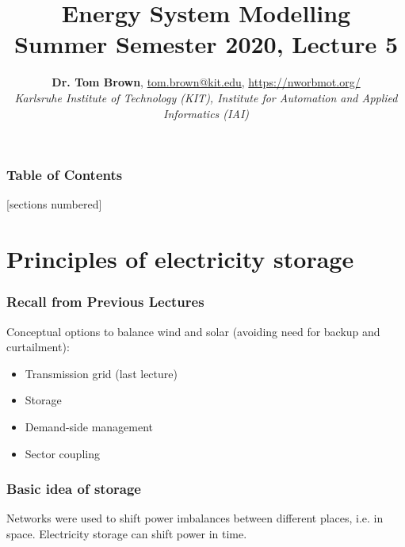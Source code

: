 \documentclass[10pt,aspectratio=169,dvipsnames]{beamer}
\title{Energy System Modelling\\ Summer Semester 2020, Lecture 5}
\author{
  {\bf Dr. Tom Brown}, \href{mailto:tom.brown@kit.edu}{tom.brown@kit.edu}, \url{https://nworbmot.org/}\\
  \emph{Karlsruhe Institute of Technology (KIT), Institute for Automation and Applied Informatics (IAI)}
}
\date{}
\let\olditem\item
\renewcommand{\item}{%
\olditem\vspace{5pt}}
\begin{document}
\maketitle


\begin{frame}

  \frametitle{Table of Contents}
  [sections numbered]
  \tableofcontents[hideallsubsections]
\end{frame}


\section{Principles of electricity storage}



\begin{frame}
 \frametitle{Recall from Previous Lectures}
 Conceptual options to balance wind and solar (avoiding need for backup and curtailment):
 \begin{itemize}
  \item Transmission grid (last lecture)
  \item \alert{Storage}
  \item Demand-side management
  \item Sector coupling
 \end{itemize}

\end{frame}

\begin{frame}
  \frametitle{Basic idea of storage}

  Networks were used to shift power imbalances between different
  places, i.e. in \alert{space}. Electricity storage can shift power in \alert{time}.

  \vspace{0.5cm}
  \centering

\end{frame}
\end{document}
